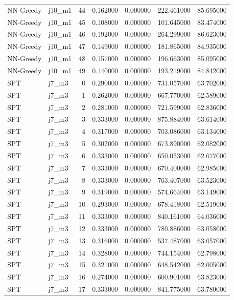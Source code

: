 \begin{tabular}{llrrrrr}
NN-Greedy & j10_m1 & 44 & 0.162000 & 0.000000 & 222.461000 & 85.695000 \\
NN-Greedy & j10_m1 & 45 & 0.108000 & 0.000000 & 101.645000 & 83.474000 \\
NN-Greedy & j10_m1 & 46 & 0.192000 & 0.000000 & 264.299000 & 86.623000 \\
NN-Greedy & j10_m1 & 47 & 0.149000 & 0.000000 & 181.865000 & 84.935000 \\
NN-Greedy & j10_m1 & 48 & 0.157000 & 0.000000 & 196.663000 & 85.095000 \\
NN-Greedy & j10_m1 & 49 & 0.140000 & 0.000000 & 193.219000 & 84.842000 \\
SPT & j7_m3 & 0 & 0.290000 & 0.000000 & 731.057000 & 63.702000 \\
SPT & j7_m3 & 1 & 0.262000 & 0.000000 & 667.770000 & 62.589000 \\
SPT & j7_m3 & 2 & 0.281000 & 0.000000 & 721.599000 & 62.836000 \\
SPT & j7_m3 & 3 & 0.333000 & 0.000000 & 875.884000 & 63.614000 \\
SPT & j7_m3 & 4 & 0.317000 & 0.000000 & 703.086000 & 63.134000 \\
SPT & j7_m3 & 5 & 0.302000 & 0.000000 & 673.890000 & 62.082000 \\
SPT & j7_m3 & 6 & 0.333000 & 0.000000 & 650.053000 & 62.677000 \\
SPT & j7_m3 & 7 & 0.333000 & 0.000000 & 670.400000 & 62.985000 \\
SPT & j7_m3 & 8 & 0.333000 & 0.000000 & 763.407000 & 63.523000 \\
SPT & j7_m3 & 9 & 0.319000 & 0.000000 & 574.664000 & 63.149000 \\
SPT & j7_m3 & 10 & 0.293000 & 0.000000 & 678.418000 & 62.519000 \\
SPT & j7_m3 & 11 & 0.333000 & 0.000000 & 840.161000 & 64.036000 \\
SPT & j7_m3 & 12 & 0.333000 & 0.000000 & 780.886000 & 63.058000 \\
SPT & j7_m3 & 13 & 0.316000 & 0.000000 & 537.487000 & 63.057000 \\
SPT & j7_m3 & 14 & 0.328000 & 0.000000 & 744.154000 & 62.798000 \\
SPT & j7_m3 & 15 & 0.321000 & 0.000000 & 648.542000 & 62.005000 \\
SPT & j7_m3 & 16 & 0.274000 & 0.000000 & 600.901000 & 63.823000 \\
SPT & j7_m3 & 17 & 0.333000 & 0.000000 & 841.775000 & 63.780000 \\

\end{tabular}
